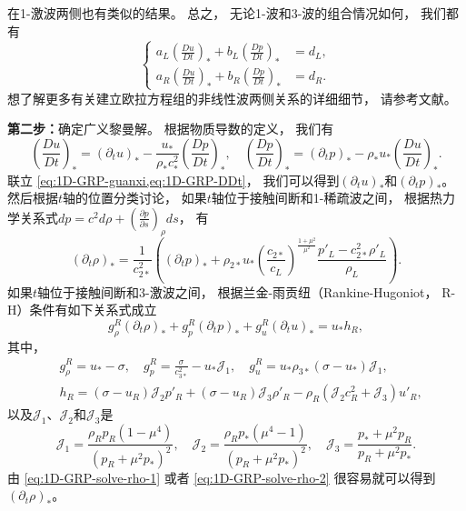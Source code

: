 在1-激波两侧也有类似的结果。
总之，
无论1-波和3-波的组合情况如何，
我们都有
\begin{equation}
  \label{eq:1D-GRP-guanxi}
  \left\{
  \begin{aligned}
    a_L \left(\frac{Du}{Dt}\right)_* + b_L \left(\frac{Dp}{Dt}\right)_* & = d_L,  \\
    a_R \left(\frac{Du}{Dt}\right)_* + b_R \left(\frac{Dp}{Dt}\right)_* & = d_R.
  \end{aligned}
  \right.
\end{equation}
想了解更多有关建立欧拉方程组的非线性波两侧关系的详细细节，
请参考文献\cite{GRPpolytropic}。

{\noindent\bf 第二步：}确定广义黎曼解。
根据物质导数的定义，
我们有
\begin{equation}
  \label{eq:1D-GRP-DDt}
  \left(\frac{Du}{Dt}\right)_{*} = \left({\partial_t}u\right)_* - \frac{u_*}{\rho_* c_*^2} \left(\frac{Dp}{Dt}\right)_{*}, \quad
  \left(\frac{Dp}{Dt}\right)_{*} = \left({\partial_t}p\right)_* - \rho_* u_* \left(\frac{Du}{Dt}\right)_{*}.
\end{equation}
联立 \cref{eq:1D-GRP-guanxi,eq:1D-GRP-DDt}，
我们可以得到$\left({\partial_t}u\right)_*$和$\left({\partial_t}p\right)_*$。
然后根据$t$轴的位置分类讨论，
如果$t$轴位于接触间断和1-稀疏波之间，
根据热力学关系式$dp = c^2 d\rho + \left( \frac{\partial p}{\partial s} \right)_\rho ds$，
有
\begin{equation}
  \label{eq:1D-GRP-solve-rho-1}
  \left({\partial_t}\rho\right)_* = \frac{1}{c_{2*}^2}\left(\left({\partial_t}p\right)_*+\rho_{2*}u_*\left(\frac{c_{2*}}{c_L}\right)^\frac{1+\mu^2}{\mu^2}\frac{p'_L-c_{2*}^2\rho'_L}{\rho_L}\right).
\end{equation}
如果$t$轴位于接触间断和3-激波之间，
根据兰金-雨贡纽（Rankine-Hugoniot，
R-H）条件有如下关系式成立
\begin{equation}
  \label{eq:1D-GRP-solve-rho-2}
  g_\rho^R \left({\partial_t}\rho\right)_* + g_p^R \left({\partial_t}p\right)_* + g_u^R \left({\partial_t}u\right)_* = u_* h_R,
\end{equation}
其中，
\begin{equation}
  \begin{aligned}
     & g_\rho^R = u_*-\sigma, \quad g_p^R = \frac{\sigma}{c_{3*}^2} - u_* \mathcal{J}_1, \quad g_u^R = u_* \rho_{3*} (\sigma-u_*) \mathcal{J}_1, \\
     & h_R = (\sigma - u_R) \mathcal{J}_2 p'_R + (\sigma - u_R) \mathcal{J}_3 \rho'_R - \rho_R(\mathcal{J}_2 c_R^2 + \mathcal{J}_3) u'_R,
  \end{aligned}
\end{equation}
以及$\mathcal{J}_1$、$\mathcal{J}_2$和$\mathcal{J}_3$是
\begin{equation}
  \mathcal{J}_1 = \frac{\rho_R p_R (1-\mu^4)}{\left(p_R + \mu^2 p_*\right)^2}, \quad \mathcal{J}_2 = \frac{\rho_R p_* (\mu^4-1)}{\left(p_R + \mu^2 p_*\right)^2}, \quad \mathcal{J}_3 = \frac{p_*+\mu^2 p_R}{p_R + \mu^2 p_*}.
\end{equation}
由 \cref{eq:1D-GRP-solve-rho-1} 或者 \cref{eq:1D-GRP-solve-rho-2} 很容易就可以得到$\left({\partial_t}\rho\right)_*$。
\vspace{0.3\baselineskip} %

